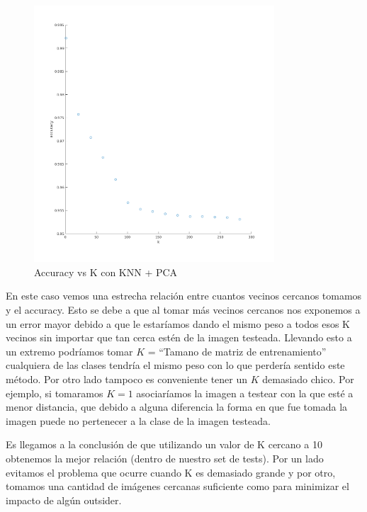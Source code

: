 \begin{figure}[H]
	\centering
	\includegraphics[width=0.8\textwidth]{img/k_pca_accu.png}
	\caption{Accuracy vs K con KNN + PCA}
	\label{fig:K vs Accuracy con KNN + PCA}
\end{figure}

En este caso vemos una estrecha relación entre cuantos vecinos cercanos tomamos y el accuracy.
Esto se debe a que al tomar más vecinos cercanos nos exponemos a un error mayor debido a que le estaríamos dando el mismo peso a todos esos K vecinos sin importar que tan cerca estén de la imagen testeada.
Llevando esto a un extremo podríamos tomar $K$ = “Tamano de matriz de entrenamiento”  cualquiera de las clases tendría el mismo peso con lo que perdería sentido este método.
Por otro lado tampoco es conveniente tener un $K$ demasiado chico. Por ejemplo, si tomaramos $K = 1$ asociaríamos la imagen a testear con la que esté a menor distancia, que debido a alguna diferencia la forma en que fue tomada la imagen puede no pertenecer a la clase de la imagen testeada.

Es llegamos a la conclusión de que utilizando un valor de K cercano a 10 obtenemos la mejor relación (dentro de nuestro set de tests).
Por un lado evitamos el problema que ocurre cuando K es demasiado grande y por otro, tomamos una cantidad de imágenes cercanas suficiente como para minimizar el impacto de algún outsider.


